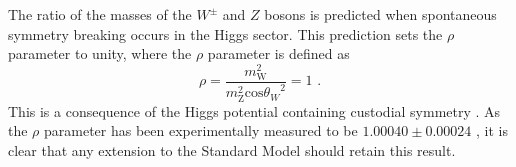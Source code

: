 The ratio of the masses of the $W^{\pm}$ and $Z$ bosons is predicted when spontaneous symmetry breaking occurs in the Higgs sector.  This prediction sets the $\rho$ parameter to unity, where the $\rho$ parameter is defined as
%
\begin{equation}
\rho = \frac{m_{\text{W}}^{2}}{m_{\text{Z}}^{2}\text{cos}{\theta_{W}}^{2}} = 1\text{ .}
\label{equ:custodialsymmetry}
\end{equation}
%
\noindent This is a consequence of the Higgs potential containing custodial symmetry \cite{Beringer:1900zz}.  As the $\rho$ parameter has been experimentally measured to be $1.00040 \pm 0.00024$ \cite{Agashe:2014kda}, it is clear that any extension to the Standard Model should retain this result.


